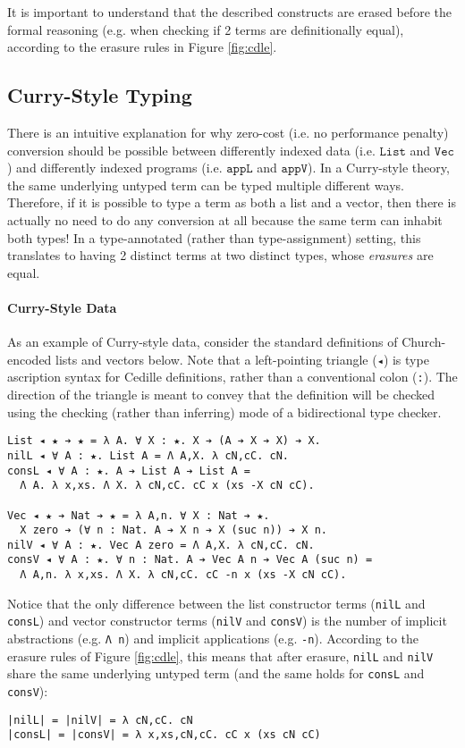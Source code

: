 \documentclass[acmsmall,screen]{acmart}
\newcommand{\labsec}[1]{\label{sec:#1}}
\newcommand{\reffig}[1]{Figure \ref{fig:#1}}
\newcommand{\txt}[1]{\ensuremath{\texttt{#1}}}
\begin{document}
It is important to understand that the described constructs are erased
before the formal reasoning (e.g. when checking if 2 terms are
definitionally equal), according to the erasure rules in
\reffig{cdle}.

\subsection{Curry-Style Typing}
\labsec{back:curry}

There is an intuitive explanation for why zero-cost (i.e. no
performance penalty) conversion should be possible
between differently indexed data (i.e. \txt{List} and \txt{Vec}) and
differently indexed programs (i.e. \txt{appL} and
\txt{appV}). In a Curry-style theory, the same
underlying untyped term can be typed multiple different
ways. Therefore, if it is possible to type a term as both a list and a
vector, then there is actually no need to do any conversion at all
because the same term can inhabit both types! In a type-annotated
(rather than type-assignment) setting, this translates to having 2
distinct terms at two distinct types, whose \textit{erasures} are equal.

\paragraph{Curry-Style Data}
As an example of Curry-style data, consider the standard definitions
of Church-encoded lists and vectors below. Note that a left-pointing
triangle (\verb;◂;) is type ascription syntax for Cedille definitions,
rather than a conventional colon (\verb;:;). The direction of the
triangle is meant to convey that the definition will be checked using
the checking (rather than inferring) mode of a bidirectional type
checker.
\begin{verbatim}
List ◂ ★ ➔ ★ = λ A. ∀ X : ★. X ➔ (A ➔ X ➔ X) ➔ X.
nilL ◂ ∀ A : ★. List A = Λ A,X. λ cN,cC. cN.
consL ◂ ∀ A : ★. A ➔ List A ➔ List A =
  Λ A. λ x,xs. Λ X. λ cN,cC. cC x (xs -X cN cC).

Vec ◂ ★ ➔ Nat ➔ ★ = λ A,n. ∀ X : Nat ➔ ★.
  X zero ➔ (∀ n : Nat. A ➔ X n ➔ X (suc n)) ➔ X n.
nilV ◂ ∀ A : ★. Vec A zero = Λ A,X. λ cN,cC. cN.
consV ◂ ∀ A : ★. ∀ n : Nat. A ➔ Vec A n ➔ Vec A (suc n) =
  Λ A,n. λ x,xs. Λ X. λ cN,cC. cC -n x (xs -X cN cC).
\end{verbatim}
Notice that the only difference between the list constructor terms
(\verb;nilL; and \verb;consL;) and vector constructor terms
(\verb;nilV; and \verb;consV;) is the number of implicit
abstractions (e.g. \verb;Λ n;) and implicit applications
(e.g. \verb;-n;). According to the erasure rules of \reffig{cdle},
this means that after erasure, \verb;nilL; and \verb;nilV; share the
same underlying untyped term
(and the same holds for \verb;consL; and \verb;consV;):
\begin{verbatim}
|nilL| = |nilV| = λ cN,cC. cN
|consL| = |consV| = λ x,xs,cN,cC. cC x (xs cN cC)
\end{verbatim}
\end{document}
